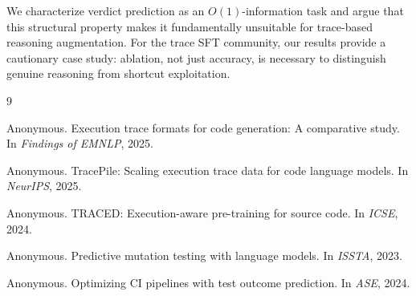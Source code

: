 \documentclass[11pt,a4paper]{article}
\begin{document}
We characterize verdict prediction as an $O(1)$-information task and argue that this structural property makes it fundamentally unsuitable for trace-based reasoning augmentation. For the trace SFT community, our results provide a cautionary case study: ablation, not just accuracy, is necessary to distinguish genuine reasoning from shortcut exploitation.

\begin{thebibliography}{9}

Anonymous.
\newblock Execution trace formats for code generation: A comparative study.
\newblock In \emph{Findings of EMNLP}, 2025.

Anonymous.
\newblock TracePile: Scaling execution trace data for code language models.
\newblock In \emph{NeurIPS}, 2025.

Anonymous.
\newblock TRACED: Execution-aware pre-training for source code.
\newblock In \emph{ICSE}, 2024.

Anonymous.
\newblock Predictive mutation testing with language models.
\newblock In \emph{ISSTA}, 2023.

Anonymous.
\newblock Optimizing CI pipelines with test outcome prediction.
\newblock In \emph{ASE}, 2024.

\end{thebibliography}
\end{document}
